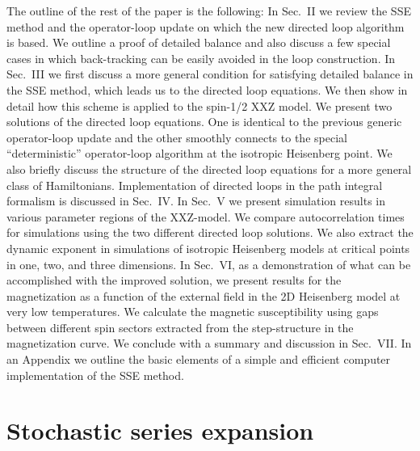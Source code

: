 \documentclass[10pt,pre,aps,twocolumn,showpacs,superscriptaddress,
floatfix]{revtex4}
\begin{document}
The outline of the rest of the paper is the following: In Sec.~II we review 
the SSE method and the operator-loop update on which the new directed loop
algorithm is based. We outline a proof of detailed balance and also discuss
a few special cases in which back-tracking can be easily avoided in the
loop construction. In Sec.~III we first discuss a more general condition for 
satisfying detailed balance in the SSE method, which leads us to the directed 
loop equations. We then show in detail how this scheme is applied to the 
spin-1/2 XXZ model. We present two solutions of the directed loop equations. 
One is identical to the previous generic operator-loop update and the other
smoothly connects to the special ``deterministic'' operator-loop 
algorithm at the isotropic Heisenberg point. We also briefly discuss the 
structure of the directed loop equations for a more general class of 
Hamiltonians. Implementation of directed loops in the path integral formalism 
is discussed in Sec.~IV. In Sec.~V we present simulation results in various 
parameter regions of the XXZ-model. We compare autocorrelation times for 
simulations using the two different directed loop solutions. We also extract 
the dynamic exponent in simulations of isotropic Heisenberg models at critical
points in one, two, and three dimensions. In Sec.~VI, as a demonstration of 
what can be accomplished with the improved solution, we present results for 
the magnetization as a function of the external field in the 2D Heisenberg 
model at very low temperatures. We calculate the magnetic susceptibility 
using gaps between different spin sectors extracted from the step-structure 
in the magnetization curve. We conclude with a summary and discussion in 
Sec.~VII. In an Appendix we outline the basic elements of a simple and 
efficient computer implementation of the SSE method.

\section{Stochastic series expansion}
\end{document}
